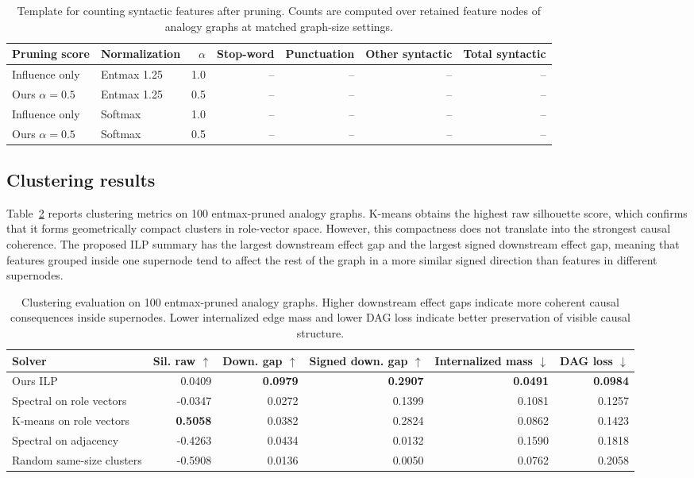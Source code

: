 \documentclass[../main.tex]{subfiles}
\begin{document}
\begin{table}[ht]
\centering
\caption{Template for counting syntactic features after pruning. Counts are
computed over retained feature nodes of analogy graphs at matched graph-size
settings.}
\label{tab:syntactic-feature-count-template}
\begin{tabular}{llrrrrr}
\toprule
Pruning score & Normalization & $\alpha$ & Stop-word & Punctuation & Other syntactic & Total syntactic \\
\midrule
Influence only & Entmax 1.25 & 1.0 & -- & -- & -- & -- \\
Ours $\alpha=0.5$ & Entmax 1.25 & 0.5 & -- & -- & -- & -- \\
Influence only & Softmax & 1.0 & -- & -- & -- & -- \\
Ours $\alpha=0.5$ & Softmax & 0.5 & -- & -- & -- & -- \\
\bottomrule
\end{tabular}
\end{table}

\subsection{Clustering results}
Table~\ref{tab:clustering-baseline-entmax} reports clustering metrics on 100
entmax-pruned analogy graphs. K-means obtains the highest raw silhouette score,
which confirms that it forms geometrically compact clusters in role-vector
space. However, this compactness does not translate into the strongest causal
coherence. The proposed ILP summary has the largest downstream effect gap and
the largest signed downstream effect gap, meaning that features grouped inside
one supernode tend to affect the rest of the graph in a more similar signed
direction than features in different supernodes.

\begin{table}[ht]
\centering
\caption{Clustering evaluation on 100 entmax-pruned analogy graphs. Higher
downstream effect gaps indicate more coherent causal consequences inside
supernodes. Lower internalized edge mass and lower DAG loss indicate better
preservation of visible causal structure.}
\label{tab:clustering-baseline-entmax}
\begin{tabular}{lrrrrr}
\toprule
Solver & Sil. raw $\uparrow$ & Down. gap $\uparrow$ & Signed down. gap $\uparrow$ & Internalized mass $\downarrow$ & DAG loss $\downarrow$ \\
\midrule
Ours ILP & 0.0409 & \textbf{0.0979} & \textbf{0.2907} & \textbf{0.0491} & \textbf{0.0984} \\
Spectral on role vectors & -0.0347 & 0.0272 & 0.1399 & 0.1081 & 0.1257 \\
K-means on role vectors & \textbf{0.5058} & 0.0382 & 0.2824 & 0.0862 & 0.1423 \\
Spectral on adjacency & -0.4263 & 0.0434 & 0.0132 & 0.1590 & 0.1818 \\
Random same-size clusters & -0.5908 & 0.0136 & 0.0050 & 0.0762 & 0.2058 \\
\bottomrule
\end{tabular}
\end{table}
\end{document}
